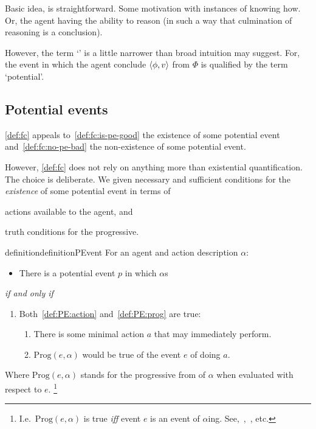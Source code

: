 \begin{note}
  Basic idea, is straightforward.
  Some motivation with instances of knowing how.
  Or, the agent having the ability to reason (in such a way that culmination of reasoning is a conclusion).

  However, the term `' is a little narrower than broad intuition may suggest.
  For, the event in which the agent conclude \(\langle \phi, v \rangle\) from \(\Phi\) is qualified by the term `potential'.
\end{note}

\subsection{Potential events}
\label{cha:sec:fcs-def:potential-events}

\begin{note}
  \autoref{def:fc} appeals to~\ref{def:fc:is-pe-good} the existence of some potential event and~\ref{def:fc:no-pe-bad} the non-existence of some potential event.

  However, \autoref{def:fc} does not rely on anything more than existential quantification.
  The choice is deliberate.
  We given necessary and sufficient conditions for the \emph{existence} of some potential event in terms of
  \begin{enumerate*}[label=(\roman*)]
  \item
    actions available to the agent, and
  \item
    truth conditions for the progressive.
  \end{enumerate*}

  \begin{restatable}{definition}{definitionPEvent}
    \label{def:potenital-event}
    For an agent \vAgent{} and action description \(\alpha\):
    \begin{itemize}
    \item
      There is a potential event \(p\) in which \vAgent{} \(\alpha\)s
    \end{itemize}
    \emph{if and only if}
    \begin{enumerate}[label=]
    \item
      Both~\ref{def:PE:action} and~\ref{def:PE:prog} are true:
      \begin{enumerate}[label=\alph*., ref=(\alph*)]
      \item
        \label{def:PE:action}
        There is some minimal action \(a\) that \vAgent{} may immediately perform.
      \item
        \label{def:PE:prog}
        \(\text{Prog}(e, \alpha)\) would be true of the  event \(e\) of \vAgent{} doing \(a\).
      \end{enumerate}
    \end{enumerate}
    Where \(\text{Prog}(e, \alpha)\) stands for the progressive from of \(\alpha\) when evaluated with respect to \(e\).%
    \footnote{
      I.e.\ \(\text{Prog}(e, \alpha)\) is true \emph{iff} event \(e\) is an event of \(\alpha\)ing.
      See,~\textcite{Richards:1981wo},~\textcite{Portner:2011vi}, etc.
    }
  \end{restatable}


\end{note}

